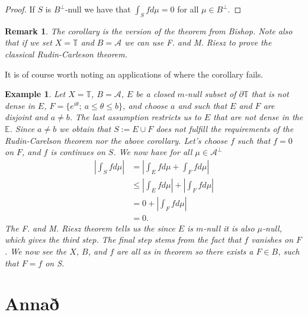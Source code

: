 \documentclass[a4paper,12pt,twoside,BCOR=10mm]{scrbook}
\newtheorem{remark}{Remark}
\newtheorem{example}{Example}
\begin{document}
\begin{proof}
If $S$ is $B^{\bot}$-null we have that $\int_S f d\mu = 0$ for all $\mu \in B^{\bot}$. %
\end{proof}
\begin{remark}
The corollary is the version of the theorem from Bishop. %
Note also that if we set $X = \mathbb{T}$ and $B = \mathcal{A}$ we can use F. and M. Riesz %
to prove the classical Rudin-Carleson theorem. %
\end{remark}
It is of course worth noting an applications of where the corollary fails.  %
\begin{example}
Let $X = \mathbb{T}$,
	$B = \mathcal{A}$, %
	$E$ be a closed $m$-null %
	subset of $\partial \mathbb{T}$ that is not dense in $E$,
	$F = \{ e^{i\theta};\ a \leq \theta \leq b \}$,
	and choose $a$ and such that $E$ and $F$ are disjoint and $a \neq b$.
The last assumption restricts us to $E$ that are not dense in the $\mathbb{E}$.
Since $a \neq b$ we obtain that $S := E \cup F$ does not fulfill the requirements of the Rudin-Carelson theorem nor the above corollary. %
Let's choose $f$ such that $f = 0$ on $F$, and $f$ is continues on $S$.
We now have for all $\mu \in \mathcal{A}^{\bot}$
\begin{align*}
	\left | \int_S f d\mu \right |
	&= \left |\int_E f d\mu + \int_F f d\mu \right |\\
	&\leq \left |\int_E f d\mu \right | + \left | \int_F f d\mu \right |\\
	&= 0 + \left | \int_F f d\mu \right |\\
	&= 0.
\end{align*}
The F. and M. Riesz theorem %
tells us the since $E$ is $m$-null it is also $\mu$-null, which gives the third step.
The final step stems from the fact that $f$ vanishes on $F$.
We now see the $X$, $B$, and $f$ are all as in theorem %
so there exists a $F \in B$, such that $F = f$ on S.
\end{example}

\appendix
\renewcommand{\chaptername}{Appendix}
\chapter{Annað}
\end{document}
